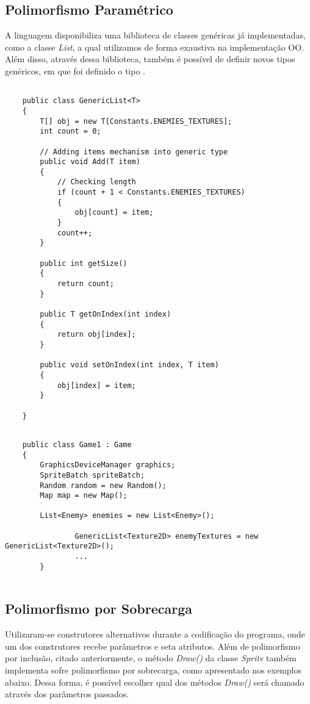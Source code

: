 \documentclass[rel_mlp]{iiufrgs}
\begin{document}
\subsection{Polimorfismo Paramétrico}

A linguagem disponibiliza uma biblioteca de classes genéricas já implementadas, como a classe \textit{List}, a qual utilizamos de forma exaustiva na implementação OO. Além disso, através dessa biblioteca, também é possível de definir novos tipos genéricos, em que foi definido o tipo .

\begin{lstlisting}[caption=Trecho de código C\# retirado da implementação deste trabalho, label=lst:test]

	public class GenericList<T>
	{
		T[] obj = new T[Constants.ENEMIES_TEXTURES];
		int count = 0;

		// Adding items mechanism into generic type
		public void Add(T item)
		{
			// Checking length
			if (count + 1 < Constants.ENEMIES_TEXTURES)
			{
				obj[count] = item;
			}
			count++;
		}

		public int getSize()
		{
			return count;
		}

		public T getOnIndex(int index)
		{
			return obj[index];
		}

		public void setOnIndex(int index, T item)
		{
			obj[index] = item;
		}

	}

\end{lstlisting}

\begin{lstlisting}[caption=Trecho de código C\# retirado da implementação deste trabalho, label=lst:test]

	public class Game1 : Game
    {
        GraphicsDeviceManager graphics;
        SpriteBatch spriteBatch;
        Random random = new Random();
        Map map = new Map();

        List<Enemy> enemies = new List<Enemy>();

				GenericList<Texture2D> enemyTextures = new GenericList<Texture2D>();
				...
		}
		
		\end{lstlisting}

\subsection{Polimorfismo por Sobrecarga}

Utilizaram-se construtores alternativos durante a codificação do programa, onde um dos construtores recebe parâmetros e seta atributos. Além de polimorfismo por inclusão, citado anteriormente, o método \textit{Draw()} da classe \textit{Sprite} também implementa sofre polimorfismo por sobrecarga, como apresentado nos exemplos abaixo. Dessa forma, é possível escolher qual dos métodos \textit{Draw()} será chamado através dos parâmetros passados.
\end{document}
